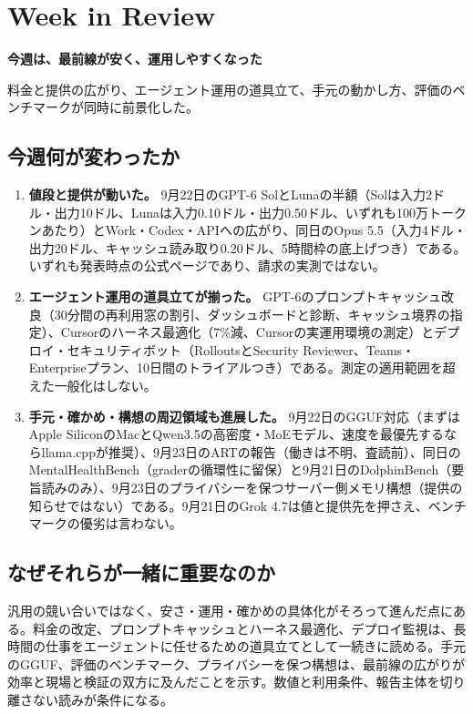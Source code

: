 \section{Week in Review}
\begin{wideflow}
{\Large\bfseries 今週は、最前線が安く、運用しやすくなった}\par
\smallskip
{\color{SurveyMuted}料金と提供の広がり、エージェント運用の道具立て、手元の動かし方、評価のベンチマークが同時に前景化した。}\par
\end{wideflow}

\subsection*{今週何が変わったか}
\begin{enumerate}[leftmargin=1.6em]
\item \textbf{値段と提供が動いた。} 9月22日のGPT-6 SolとLunaの半額（Solは入力2ドル・出力10ドル、Lunaは入力0.10ドル・出力0.50ドル、いずれも100万トークンあたり）とWork・Codex・APIへの広がり、同日のOpus 5.5（入力4ドル・出力20ドル、キャッシュ読み取り0.20ドル、5時間枠の底上げつき）である。いずれも発表時点の公式ページであり、請求の実測ではない。
\item \textbf{エージェント運用の道具立てが揃った。} GPT-6のプロンプトキャッシュ改良（30分間の再利用窓の割引、ダッシュボードと診断、キャッシュ境界の指定）、Cursorのハーネス最適化（7\%減、Cursorの実運用環境の測定）とデプロイ・セキュリティボット（RolloutsとSecurity Reviewer、Teams・Enterpriseプラン、10日間のトライアルつき）である。測定の適用範囲を超えた一般化はしない。
\item \textbf{手元・確かめ・構想の周辺領域も進展した。} 9月22日のGGUF対応（まずはApple SiliconのMacとQwen3.5の高密度・MoEモデル、速度を最優先するならllama.cppが推奨）、9月23日のARTの報告（働きは不明、査読前）、同日のMentalHealthBench（graderの循環性に留保）と9月21日のDolphinBench（要旨読みのみ）、9月23日のプライバシーを保つサーバー側メモリ構想（提供の知らせではない）である。9月21日のGrok 4.7は値と提供先を押さえ、ベンチマークの優劣は言わない。
\end{enumerate}

\subsection*{なぜそれらが一緒に重要なのか}
汎用の競い合いではなく、安さ・運用・確かめの具体化がそろって進んだ点にある。料金の改定、プロンプトキャッシュとハーネス最適化、デプロイ監視は、長時間の仕事をエージェントに任せるための道具立てとして一続きに読める。手元のGGUF、評価のベンチマーク、プライバシーを保つ構想は、最前線の広がりが効率と現場と検証の双方に及んだことを示す。数値と利用条件、報告主体を切り離さない読みが条件になる。

